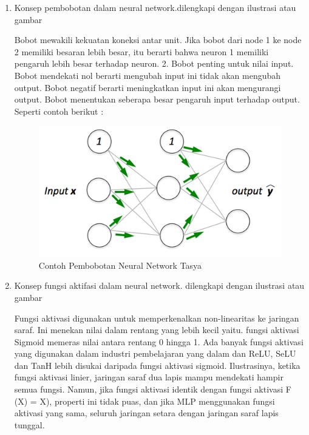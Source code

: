 \begin{enumerate}
\item Konsep pembobotan dalam neural network.dilengkapi dengan ilustrasi atau gambar
\par Bobot mewakili kekuatan koneksi antar unit. Jika bobot dari node 1 ke node 2 memiliki besaran lebih besar, itu berarti bahwa neuron 1 memiliki pengaruh lebih besar terhadap neuron. 2. Bobot penting untuk nilai input. Bobot mendekati nol berarti mengubah input ini tidak akan mengubah output. Bobot negatif berarti meningkatkan input ini akan mengurangi output. Bobot menentukan seberapa besar pengaruh input terhadap output. Seperti contoh berikut :
\begin{figure}[ht]
\centering
\includegraphics[scale=0.5]{figures/chapter6tasya2.png}
\caption{Contoh Pembobotan Neural Network Tasya}
\label{Teori}
\end{figure}

\item Konsep fungsi aktifasi dalam neural network. dilengkapi dengan ilustrasi atau gambar
\par Fungsi aktivasi digunakan untuk memperkenalkan non-linearitas ke jaringan saraf. Ini menekan nilai dalam rentang yang lebih kecil yaitu. fungsi aktivasi Sigmoid memeras nilai antara rentang 0 hingga 1. Ada banyak fungsi aktivasi yang digunakan dalam industri pembelajaran yang dalam dan ReLU, SeLU dan TanH lebih disukai daripada fungsi aktivasi sigmoid. Ilustrasinya, ketika fungsi aktivasi linier, jaringan saraf dua lapis mampu mendekati hampir semua fungsi. Namun, jika fungsi aktivasi identik dengan fungsi aktivasi F (X) = X), properti ini tidak puas, dan jika MLP menggunakan fungsi aktivasi yang sama, seluruh jaringan setara dengan jaringan saraf lapis tunggal.


\end{enumerate}
